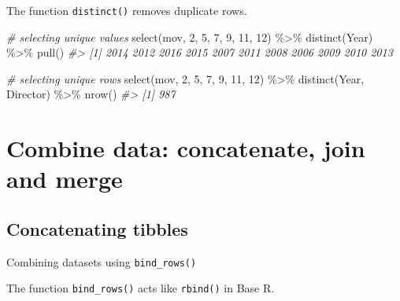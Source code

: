 \documentclass[
]{book}
\newenvironment{Shaded}{\begin{snugshade}}{\end{snugshade}}
\newcommand{\CommentTok}[1]{\textcolor[rgb]{0.56,0.35,0.01}{\textit{#1}}}
\newcommand{\DecValTok}[1]{\textcolor[rgb]{0.00,0.00,0.81}{#1}}
\newcommand{\FunctionTok}[1]{\textcolor[rgb]{0.00,0.00,0.00}{#1}}
\newcommand{\NormalTok}[1]{#1}
\newcommand{\SpecialCharTok}[1]{\textcolor[rgb]{0.00,0.00,0.00}{#1}}
\begin{document}
The function \texttt{distinct()} removes duplicate rows.

\begin{Shaded}
\begin{Highlighting}[]
\CommentTok{\# selecting unique values}
\FunctionTok{select}\NormalTok{(mov, }\DecValTok{2}\NormalTok{, }\DecValTok{5}\NormalTok{, }\DecValTok{7}\NormalTok{, }\DecValTok{9}\NormalTok{, }\DecValTok{11}\NormalTok{, }\DecValTok{12}\NormalTok{) }\SpecialCharTok{\%\textgreater{}\%}
\FunctionTok{distinct}\NormalTok{(Year) }\SpecialCharTok{\%\textgreater{}\%}
\FunctionTok{pull}\NormalTok{()}
\CommentTok{\#\textgreater{}  [1] 2014 2012 2016 2015 2007 2011 2008 2006 2009 2010 2013}

\CommentTok{\# selecting unique rows}
\FunctionTok{select}\NormalTok{(mov, }\DecValTok{2}\NormalTok{, }\DecValTok{5}\NormalTok{, }\DecValTok{7}\NormalTok{, }\DecValTok{9}\NormalTok{, }\DecValTok{11}\NormalTok{, }\DecValTok{12}\NormalTok{) }\SpecialCharTok{\%\textgreater{}\%}
\FunctionTok{distinct}\NormalTok{(Year, Director) }\SpecialCharTok{\%\textgreater{}\%}
\FunctionTok{nrow}\NormalTok{()}
\CommentTok{\#\textgreater{} [1] 987}
\end{Highlighting}
\end{Shaded}

\hypertarget{tr-joins}{%
\section{Combine data: concatenate, join and merge}\label{tr-joins}}

\hypertarget{concatenating-tibbles}{%
\subsection{Concatenating tibbles}\label{concatenating-tibbles}}

Combining datasets using \texttt{bind\_rows()}

The function \texttt{bind\_rows()} acts like \texttt{rbind()} in Base R.
\end{document}
